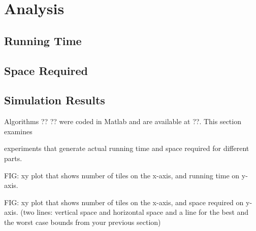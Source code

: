 



\section{Analysis}\label{sec:Analysis}

\subsection{Running Time}\label{sec:runningTime}


\subsection{Space Required}\label{sec:requiredSpace}

\subsection{Simulation Results}\label{sec:simResults}

Algorithms ?? ?? were coded in {\sc Matlab} and are available at ??.  This section examines 

experiments that generate actual running time and space required for different parts.

FIG: xy plot that shows number of tiles on the x-axis, and running time  on  y-axis.  


FIG: xy plot that shows number of tiles on the x-axis, and space required  on  y-axis.   (two lines: vertical space and horizontal space and a line for the best and the  worst case bounds from your previous section)